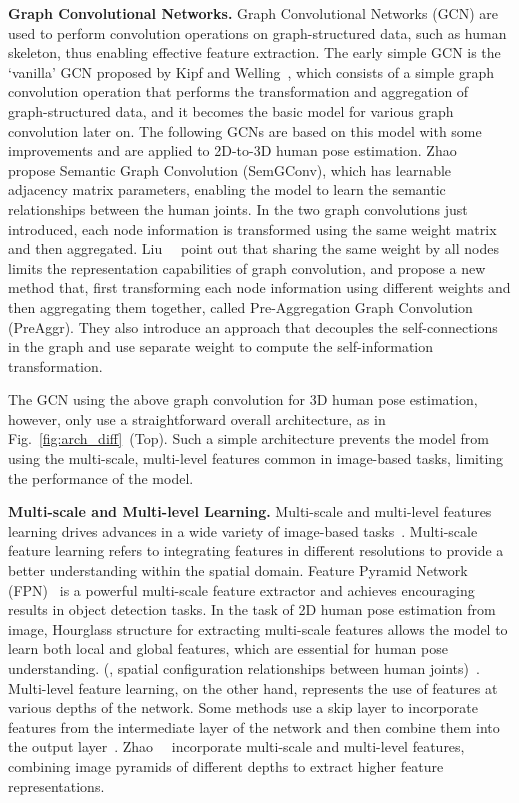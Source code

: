 \documentclass[final]{cvpr}
\begin{document}
\textbf{Graph Convolutional Networks.}
Graph Convolutional Networks (GCN) are used to perform convolution operations on graph-structured data, such as human skeleton, thus enabling effective feature extraction.
The early simple GCN is the `vanilla' GCN proposed by Kipf and Welling~\cite{Kipf:2016tc},
which consists of a simple graph convolution operation that performs the transformation and aggregation of graph-structured data, and it becomes the basic model for various graph convolution later on.
The following GCNs are based on this model with some improvements and are applied to 2D-to-3D human pose estimation.
Zhao~\etal~\cite{zhaoCVPR19semantic} propose Semantic Graph Convolution (SemGConv), which has learnable adjacency matrix parameters, 
enabling the model to learn the semantic relationships between the human joints.
In the two graph convolutions just introduced, each node information is transformed using the same weight matrix and then aggregated.
Liu~\etal~\cite{Liu2020} point out that sharing the same weight by all nodes limits the representation capabilities of graph convolution, 
and propose a new method that, first transforming each node information using different weights and then aggregating them together, called Pre-Aggregation Graph Convolution (PreAggr).
They also introduce an approach that decouples the self-connections in the graph and use separate weight to compute the self-information transformation.

The GCN using the above graph convolution for 3D human pose estimation, however, only use a straightforward overall architecture, as in Fig.~\ref{fig:arch_diff}~(Top).
Such a simple architecture prevents the model from using the multi-scale, multi-level features common in image-based tasks, limiting the performance of the model.

\textbf{Multi-scale and Multi-level Learning.}
Multi-scale and multi-level features learning drives advances in a wide variety of image-based tasks~\cite{RFB15a, DBLP:conf/eccv/LiuAESRFB16}.
Multi-scale feature learning refers to integrating features in different resolutions to provide a better understanding within the spatial domain.
Feature Pyramid Network (FPN)~\cite{FPN2017} is a powerful multi-scale feature extractor and achieves encouraging results in object detection tasks.
In the task of 2D human pose estimation from image, Hourglass structure for extracting multi-scale features allows the model to learn both local and global features, which are essential for human pose understanding.
 (\eg, spatial configuration relationships between human joints)~\cite{Newell2016StackedHN,NIPS2017_8edd7215,sun2019deep}.
Multi-level feature learning, on the other hand, represents the use of features at various depths of the network.
Some methods use a skip layer to incorporate features from the intermediate layer of the network and then combine them into the output layer~\cite{DeepEdge2015,FCN2015}.
Zhao~\etal~\cite{M2Det2019aaai} incorporate multi-scale and multi-level features, combining image pyramids of different depths to extract higher feature representations.
\end{document}
